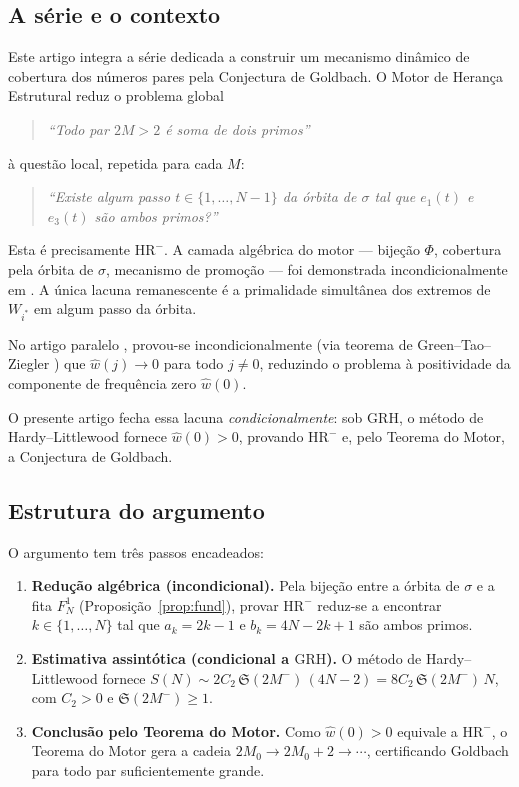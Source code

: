 \documentclass[12pt,a4paper]{article}
\theoremstyle{definition}
\newcommand{\HRm}{\mathrm{HR}^{-}}
\newcommand{\GRH}{\mathrm{GRH}}
\newcommand{\Ss}{\mathfrak{S}}         %
\newcommand{\1}[1]{\mathbf{1}_{#1}}
\begin{document}
	\subsection{A série e o contexto}
	
	Este artigo integra a série \cite{goldbach1,grade,ancora,crivo_b,motor,espectral}
	dedicada a construir um mecanismo dinâmico de cobertura dos números pares
	pela Conjectura de Goldbach. O Motor de Herança Estrutural \cite{motor}
	reduz o problema global
	\begin{quote}
		\emph{``Todo par $2M > 2$ é soma de dois primos''}
	\end{quote}
	à questão local, repetida para cada $M$:
	\begin{quote}
		\emph{``Existe algum passo $t \in \{1,\ldots,N-1\}$ da órbita de
			$\sigma$ tal que $e_1(t)$ e $e_3(t)$ são ambos primos?''}
	\end{quote}
	Esta é precisamente $\HRm$. A camada algébrica do motor --- bijeção $\Phi$,
	cobertura pela órbita de $\sigma$, mecanismo de promoção --- foi demonstrada
	incondicionalmente em \cite{motor}. A única lacuna remanescente é a
	primalidade simultânea dos extremos de $W_{i^*}$ em algum passo da órbita.
	
	No artigo paralelo \cite{espectral}, provou-se incondicionalmente (via
	teorema de Green--Tao--Ziegler \cite{greentaoziegler}) que $\widehat{w}(j)
	\to 0$ para todo $j \neq 0$, reduzindo o problema à positividade da
	componente de frequência zero $\widehat{w}(0)$.
	
	O presente artigo fecha essa lacuna \emph{condicionalmente}: sob $\GRH$,
	o método de Hardy--Littlewood fornece $\widehat{w}(0) > 0$, provando $\HRm$
	e, pelo Teorema do Motor, a Conjectura de Goldbach.
	
	\subsection{Estrutura do argumento}
	
	O argumento tem três passos encadeados:
	
	\begin{enumerate}[label=(\roman*)]
		\item \textbf{Redução algébrica (incondicional).} Pela bijeção entre
		a órbita de $\sigma$ e a fita $F_N^1$ (Proposição~\ref{prop:fund}),
		provar $\HRm$ reduz-se a encontrar $k \in \{1,\ldots,N\}$ tal que
		$a_k = 2k-1$ e $b_k = 4N-2k+1$ são ambos primos.
		
		\item \textbf{Estimativa assintótica (condicional a $\GRH$).} O
		método de Hardy--Littlewood fornece $S(N) \sim 2C_2\,\Ss(2M^-)\,
		(4N-2) = 8C_2\,\Ss(2M^-)\,N$, com $C_2 > 0$ e $\Ss(2M^-) \geq 1$.
		
		\item \textbf{Conclusão pelo Teorema do Motor.} Como $\widehat{w}(0)
		> 0$ equivale a $\HRm$, o Teorema do Motor \cite[Thm.~7.3]{motor}
		gera a cadeia $2M_0 \to 2M_0+2 \to \cdots$, certificando Goldbach
		para todo par suficientemente grande.
	\end{enumerate}
	
\end{document}
